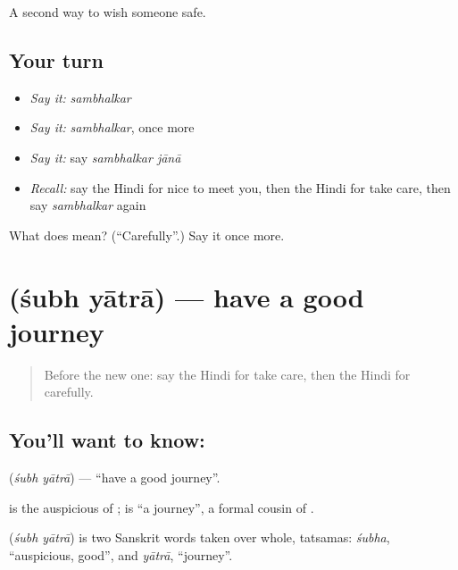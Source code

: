 \begin{grammarlens}[title={What you've built}]
A second way to wish someone safe.
\end{grammarlens}

\subsection*{Your turn}
\begin{itemize}
\raggedright
  \item \emph{Say it:} \emph{sambhalkar}
  \item \emph{Say it:} \emph{sambhalkar}, once more
  \item \emph{Say it:} say \emph{sambhalkar jānā}
  \item \emph{Recall:} say the Hindi for nice to meet you, then the Hindi for take care, then say \emph{sambhalkar} again
\end{itemize}

\begin{tcolorbox}[breakable,colback=teal!4,colframe=teal!35!black,title={Before you move on}]
What does  mean? (\textquotedblleft{}Carefully\textquotedblright{}.) Say it once more.
\end{tcolorbox}
\section[\texorpdfstring{\hi{शुभ} \hi{यात्रा} (śubh yātrā)}{शुभ यात्रा (śubh yātrā)}]{  (śubh yātrā) — have a good journey}

\label{lesson:HI-C121-shubhyatra}



\begin{quote}
Before the new one: say the Hindi for take care, then the Hindi for carefully.
\end{quote}

\subsection*{You'll want to know:  }
\textbf{ } (\emph{śubh yātrā}) — \textquotedblleft{}have a good journey\textquotedblright{}.

\textbf{} is the auspicious of \textbf{ }; \textbf{} is \textquotedblleft{}a journey\textquotedblright{}, a formal cousin of \textbf{}.

\begin{cousinweb}
\textbf{ } (\emph{śubh yātrā}) is two Sanskrit words taken over whole, tatsamas: \emph{śubha}, \textquotedblleft{}auspicious, good\textquotedblright{}, and \emph{yātrā}, \textquotedblleft{}journey\textquotedblright{}.
\end{cousinweb}

